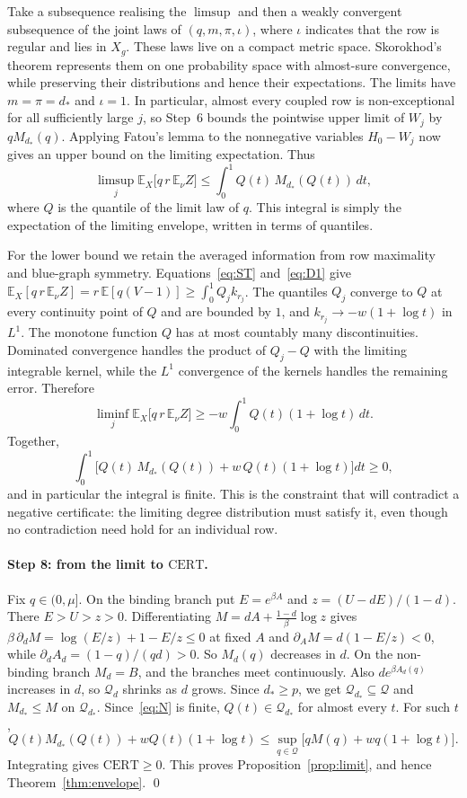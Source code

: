 \documentclass[11pt]{article}
\theoremstyle{definition}
\theoremstyle{remark}
\newcommand{\E}{\mathbb{E}}
\newcommand{\cert}{\mathrm{CERT}}
\newcommand{\feas}{\mathcal Q}
\begin{document}
Take a subsequence realising the $\limsup$ and then a weakly convergent subsequence of the joint laws of
$(q,m,\pi,\iota)$, where $\iota$ indicates that the row is regular and lies in $X_g$.
These laws live on a compact metric space. Skorokhod's theorem represents them on one probability space with
almost-sure convergence, while preserving their distributions and hence their expectations.
The limits have $m=\pi=d_*$ and $\iota=1$. In particular, almost every coupled row is non-exceptional for all
sufficiently large $j$, so Step~6 bounds the pointwise upper limit of $W_j$ by $qM_{d_*}(q)$.
Applying Fatou's lemma to the nonnegative variables $H_0-W_j$ now gives an upper bound on the limiting
expectation. Thus
\[
\limsup_j\E_X\big[q\,r\,\E_\nu Z\big]\le\int_0^1Q(t)\,M_{d_*}(Q(t))\,dt,
\]
where $Q$ is the quantile of the limit law of $q$. This integral is simply the expectation of the limiting
envelope, written in terms of quantiles.

For the lower bound we retain the averaged information from row maximality and blue-graph symmetry.
Equations~\eqref{eq:ST} and~\eqref{eq:D1} give
$\E_X[q\,r\,\E_\nu Z]=r\,\E[q(V-1)]\ge\int_0^1Q_jk_{r_j}$. The quantiles $Q_j$ converge to $Q$ at every continuity point
of $Q$ and are bounded by $1$, and $k_{r_j}\to-w(1+\log t)$ in $L^1$.
The monotone function $Q$ has at most countably many discontinuities. Dominated convergence handles the
product of $Q_j-Q$ with the limiting integrable kernel, while the $L^1$ convergence of the kernels handles
the remaining error. Therefore
\[
\liminf_j\E_X\big[q\,r\,\E_\nu Z\big]\ge-w\int_0^1Q(t)(1+\log t)\,dt.
\]
Together,
\begin{equation}\label{eq:N}
\int_0^1\Big[Q(t)\,M_{d_*}(Q(t))+w\,Q(t)(1+\log t)\Big]dt\ge0,
\end{equation}
and in particular the integral is finite. This is the constraint that will contradict a negative certificate:
the limiting degree distribution must satisfy it, even though no contradiction need hold for an individual row.

\paragraph{Step 8: from the limit to $\cert$.} Fix $q\in(0,\mu]$. On the binding branch put $E=e^{\beta A}$ and
$z=(U-dE)/(1-d)$. There $E>U>z>0$. Differentiating $M=dA+\frac{1-d}\beta\log z$ gives
$\beta\,\partial_dM=\log(E/z)+1-E/z\le0$ at fixed $A$ and $\partial_AM=d(1-E/z)<0$, while $\partial_dA_d=(1-q)/(qd)>0$.
So $M_d(q)$ decreases in $d$. On the non-binding branch $M_d=B$, and the branches meet continuously. Also
$de^{\beta A_d(q)}$ increases in $d$, so $\feas_d$ shrinks as $d$ grows. Since $d_*\ge p$, we get $\feas_{d_*}\subseteq\feas$
and $M_{d_*}\le M$ on $\feas_{d_*}$. Since~\eqref{eq:N} is finite, $Q(t)\in\feas_{d_*}$ for almost every $t$. For such
$t$,
\[
Q(t)M_{d_*}(Q(t))+wQ(t)(1+\log t)\le\sup_{q\in\feas}\big[qM(q)+wq(1+\log t)\big].
\]
Integrating gives $\cert\ge0$. This proves Proposition~\ref{prop:limit}, and hence Theorem~\ref{thm:envelope}. \qed
\end{document}
